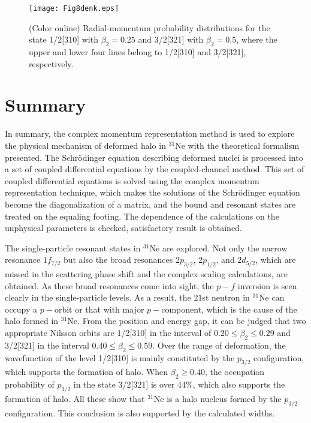 \documentclass[twocolumn,prc,showpacs,preprintnumbers,superscriptaddress,floatfix]{revtex4}
\begin{document}
\begin{figure}[tph]
\centering%
\texttt{[image: Fig8denk.eps]}\centering
\caption{(Color online) Radial-momentum probability distributions for the state 1/2[310] with $\beta_2=0.25$ and 3/2[321] with $\beta_2=0.5$, where the upper and lower four lines belong to 1/2[310] and 3/2[321], respectively.}
\end{figure}


\section{Summary}

In summary, the complex momentum representation method is used to explore
the physical mechanism of deformed halo in $^{31}$Ne with the theoretical
formalism presented. The Schr\"{o}dinger equation describing deformed nuclei
is processed into a set of coupled differential equations by the
coupled-channel method. This set of coupled differential equations is solved
using the complex momentum representation technique, which makes the
solutions of the Schr\"{o}dinger equation become the diagonalization of a
matrix, and the bound and resonant states are treated on the equaling
footing. The dependence of the calculations on the unphysical parameters is
checked, satisfactory result is obtained.

The single-particle resonant states in $^{31}$Ne are explored. Not only the
narrow resonance $1f_{7/2}$ but also the broad resonances $2p_{3/2}$, $%
2p_{1/2}$, and $2d_{5/2}$, which are missed in the scattering phase shift
and the complex scaling calculations, are obtained. As these broad
resonances come into sight, the $p-f$ inversion is seen clearly in the
single-particle levels. As a result, the $21$st neutron in $^{31}$Ne can
occupy a $p-$orbit or that with major $p-$component, which is the cause of
the halo formed in $^{31}$Ne. From the position and energy gap, it can be
judged that two appropriate Nilsson orbits are 1/2[310] in the interval of $%
0.20\leqslant \beta _{2}\leqslant 0.29$ and 3/2[321] in the interval $%
0.40\leqslant \beta _{2}\leqslant 0.59$. Over the range of deformation, the
wavefunction of the level 1/2[310] is mainly constituted by the $p_{3/2}$
configuration, which supports the formation of halo. When $\beta
_{2}\geqslant 0.40$, the occupation probability of $p_{3/2}$ in the state
3/2[321] is over 44\%, which also supports the formation of halo. All these
show that $^{31}$Ne is a halo nucleus formed by the $p_{3/2}$ configuration.
This conclusion is also supported by the calculated widths.
\end{document}
